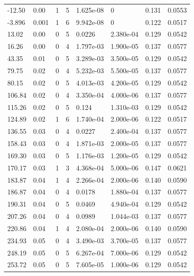 \documentclass[preview]{standalone}
\begin{document}
{{\begin{tabular}{L{1.2cm}C{1.2cm} C{0.3cm}C{0.5cm} C{1.4cm}C{1.4cm} C{1.4cm}C{1.4cm}}
  -12.50  &  0.00  & 1     &  5 &  1.625e-08  & 0  & 0.131 &  0.0553   \\ 
  -3.896  &  0.001  & 1     &  6 &  9.942e-08  & 0  & 0.122 &  0.0517   \\ 
  13.02  &  0.00  & 0     &  5 &  0.0226  & 2.380e-04  & 0.129 &  0.0542   \\ 
  16.26  &  0.00  & 0     &  4 &  1.797e-03  & 1.900e-05  & 0.137 &  0.0577   \\ 
  43.35  &  0.01  & 0     &  5 &  3.289e-03  & 3.500e-05  & 0.129 &  0.0542   \\ 
  79.75  &  0.02  & 0     &  4 &  5.232e-03  & 5.500e-05  & 0.137 &  0.0577   \\ 
  80.15  &  0.02  & 0     &  5 &  4.013e-03  & 4.200e-05  & 0.129 &  0.0542   \\ 
  106.84  &  0.02  & 0     &  4 &  3.350e-04  & 4.000e-06  & 0.137 &  0.0577   \\ 
  115.26  &  0.02  & 0     &  5 &  0.124  & 1.310e-03  & 0.129 &  0.0542   \\ 
  124.89  &  0.02  & 1     &  6 &  1.740e-04  & 2.000e-06  & 0.122 &  0.0517   \\ 
  136.55  &  0.03  & 0     &  4 &  0.0227  & 2.400e-04  & 0.137 &  0.0577   \\ 
  158.43  &  0.03  & 0     &  4 &  1.871e-03  & 2.000e-05  & 0.137 &  0.0577   \\ 
  169.30  &  0.03  & 0     &  5 &  1.176e-03  & 1.200e-05  & 0.129 &  0.0542   \\ 
  170.17  &  0.03  & 1     &  3 &  4.368e-04  & 5.000e-06  & 0.147 &  0.0621   \\ 
  183.87  &  0.04  & 1     &  4 &  2.266e-04  & 2.000e-06  & 0.140 &  0.0590   \\ 
  186.87  &  0.04  & 0     &  4 &  0.0178  & 1.880e-04  & 0.137 &  0.0577   \\ 
  190.31  &  0.04  & 0     &  5 &  0.0469  & 4.940e-04  & 0.129 &  0.0542   \\ 
  207.26  &  0.04  & 0     &  4 &  0.0989  & 1.044e-03  & 0.137 &  0.0577   \\ 
  220.86  &  0.04  & 1     &  4 &  2.080e-04  & 2.000e-06  & 0.140 &  0.0590   \\ 
  234.93  &  0.05  & 0     &  4 &  3.490e-03  & 3.700e-05  & 0.137 &  0.0577   \\ 
  248.19  &  0.05  & 0     &  5 &  6.267e-04  & 7.000e-06  & 0.129 &  0.0542   \\ 
  253.72  &  0.05  & 0     &  5 &  7.605e-05  & 1.000e-06  & 0.129 &  0.0542   \\ 

\end{tabular}}}
\end{document}
